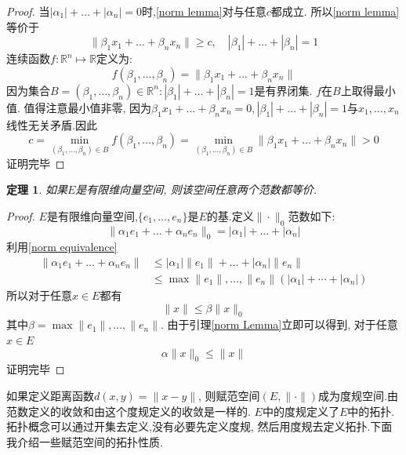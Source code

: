 \documentclass[a4paper,11pt]{article}
\newtheorem{theorem}{\hspace{2em}定理}[section]
\newtheorem{proof}{证明}[section]
\begin{document}
\begin{proof}
  当$|\alpha_1|+\dots+|\alpha_n|=0$时,\eqref{norm lemma}对与任意$c$都成立. 所以\eqref{norm lemma}等价于
  \begin{equation*}
    \|\beta_1x_1+\dots+\beta_nx_n\|\geq c,\quad|\beta_1|+\dots+|\beta_n|=1
  \end{equation*}
  连续函数$f:\mathbb{R}^n\mapsto\mathbb{R}$定义为:
  \begin{equation*}
    f(\beta_1,\dots,\beta_n)=\|\beta_1x_1+\dots+\beta_nx_n\|
  \end{equation*}
  因为集合$B={(\beta_1,\dots,\beta_n)\in\mathbb{R}^n:|\beta_1|+\dots+|\beta_n|=1}$是有界闭集. $f$在$B$上取得最小值. 值得注意最小值非零, 因为$\beta_1x_1+\dots+\beta_nx_n=0,|\beta_1|+\dots+|\beta_n|=1$与$x_1,\dots,x_n$线性无关矛盾.因此
  \begin{equation*}
    c=\min_{(\beta_1,\dots,\beta_n)\in B}f(\beta_1,\dots,\beta_n)=\min_{(\beta_1,\dots,\beta_n)\in B}\|\beta_1x_1+\dots+\beta_nx_n\|>0
  \end{equation*}
  证明完毕
\end{proof}
\begin{theorem}
  如果$E$是有限维向量空间, 则该空间任意两个范数都等价.
\end{theorem}
\begin{proof}
  $E$是有限维向量空间,$\{e_1,\dots,e_n\}$是$E$的基.定义$\|\cdot\|_0$范数如下:
  \begin{equation*}
    \|\alpha_1e_1+\dots+\alpha_ne_n\|_0=|\alpha_1|+\dots+|\alpha_n|
  \end{equation*}
  利用\ref{norm equivalence}
  \begin{equation*}
  \begin{split}
     \|\alpha_1e_1+\dots+\alpha_ne_n\|&\leq|\alpha_1|\|e_1\|+\dots+|\alpha_n|\|e_n\| \\
       &\leq\max{\|e_1\|,\dots,\|e_n\|}(|\alpha_1|+\cdots+|\alpha_n|)
  \end{split}
  \end{equation*}
  所以对于任意$x\in E$都有
  \begin{equation*}
    \|x\|\leq\beta\|x\|_0
  \end{equation*}
  其中$\beta=\max{\|e_1\|,\dots,\|e_n\|}$. 由于引理\ref{norm Lemma}立即可以得到, 对于任意$x\in E$
  \begin{equation*}
    \alpha\|x\|_0\leq\|x\|
  \end{equation*}
  证明完毕
\end{proof}
如果定义距离函数$d(x,y)=\|x-y\|$, 则赋范空间$(E,\|\cdot\|)$成为度规空间.由范数定义的收敛和由这个度规定义的收敛是一样的. $E$中的度规定义了$E$中的拓扑. 拓扑概念可以通过开集去定义,没有必要先定义度规, 然后用度规去定义拓扑.下面我介绍一些赋范空间的拓扑性质.
\end{document}
